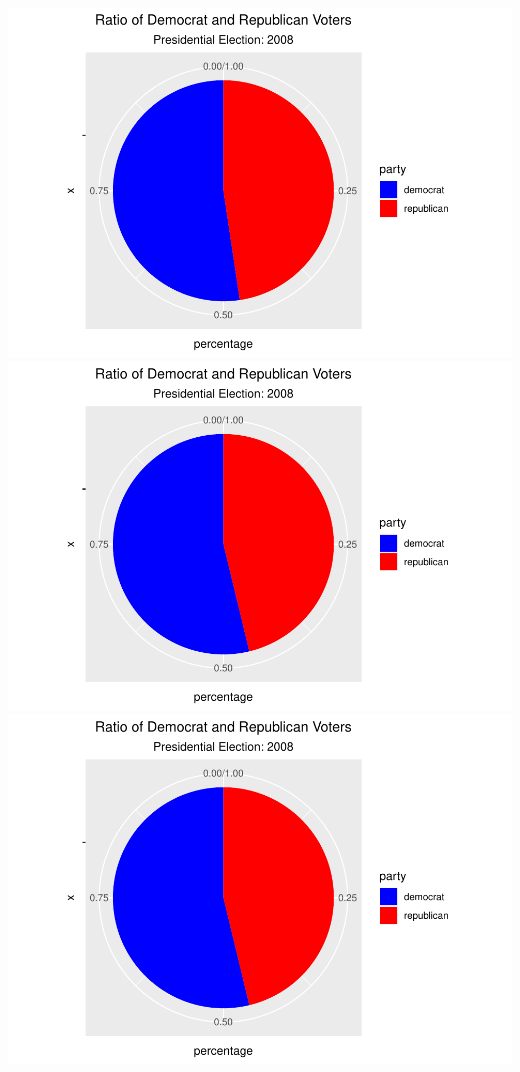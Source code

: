 \documentclass[
]{article}
\begin{document}
\includegraphics{election_files/figure-latex/anim-73.pdf}
\includegraphics{election_files/figure-latex/anim-74.pdf}
\includegraphics{election_files/figure-latex/anim-75.pdf}
\end{document}
